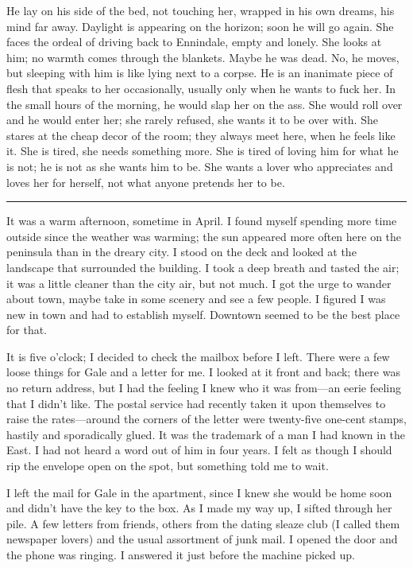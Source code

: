 He lay on his side of the bed, not touching her, wrapped in his own
dreams, his mind far away. Daylight is appearing on the horizon; soon he
will go again. She faces the ordeal of driving back to Ennindale, empty
and lonely. She looks at him; no warmth comes through the blankets.
Maybe he was dead. No, he moves, but sleeping with him is like lying
next to a corpse. He is an inanimate piece of flesh that speaks to her
occasionally, usually only when he wants to fuck her. In the small hours
of the morning, he would slap her on the ass. She would roll over and he
would enter her; she rarely refused, she wants it to be over with. She
stares at the cheap decor of the room; they always meet here, when he
feels like it. She is tired, she needs something more. She is tired of
loving him for what he is not; he is not as she wants him to be. She
wants a lover who appreciates and loves her for herself, not what anyone
pretends her to be.

\begin{center}\rule{0.5\linewidth}{0.5pt}\end{center}

It was a warm afternoon, sometime in April. I found myself spending more
time outside since the weather was warming; the sun appeared more often
here on the peninsula than in the dreary city. I stood on the deck and
looked at the landscape that surrounded the building. I took a deep
breath and tasted the air; it was a little cleaner than the city air,
but not much. I got the urge to wander about town, maybe take in some
scenery and see a few people. I figured I was new in town and had to
establish myself. Downtown seemed to be the best place for that.

It is five o'clock; I decided to check the mailbox before I left. There
were a few loose things for Gale and a letter for me. I looked at it
front and back; there was no return address, but I had the feeling I
knew who it was from---an eerie feeling that I didn't like. The postal
service had recently taken it upon themselves to raise the
rates---around the corners of the letter were twenty-five one-cent
stamps, hastily and sporadically glued. It was the trademark of a man I
had known in the East. I had not heard a word out of him in four years.
I felt as though I should rip the envelope open on the spot, but
something told me to wait.

I left the mail for Gale in the apartment, since I knew she would be
home soon and didn't have the key to the box. As I made my way up, I
sifted through her pile. A few letters from friends, others from the
dating sleaze club (I called them newspaper lovers) and the usual
assortment of junk mail. I opened the door and the phone was ringing. I
answered it just before the machine picked up.

